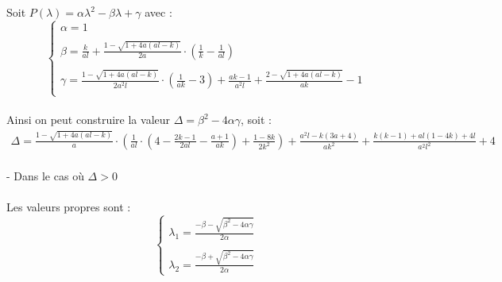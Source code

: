 \documentclass{article}
\begin{document}
Soit $ P(\lambda)= \alpha \lambda^{2} - \beta \lambda + \gamma$ avec : 
\begin{equation*}
\left \{
\begin{array}{l}
     \alpha = 1\\\\
     \beta =  \frac{k}{al} + \frac{1 - \sqrt{1 + 4a(al -k)}}{2a} \cdot \left( \frac{1}{k} - \frac{1}{al} \right) \\\\
     \gamma = \frac{1 - \sqrt{1 + 4a(al -k)}}{2a^2 l} \cdot \left( \frac{1}{ak} - 3 \right) + \frac{ak - 1}{a^2 l} + \frac{2- \sqrt{1 + 4a(al -k)}}{ak} -1 \\
\end{array}
\right.
\end{equation*}\\

Ainsi on peut construire la valeur $ \Delta = \beta^2 - 4 \alpha \gamma $, soit :
\begin{equation*}
\tag{ \Delta }
\label{pt4:delta}
    \begin{array}{l}
        \Delta = \frac{1 - \sqrt{1 + 4a(al -k)}}{a} \cdot \left( \frac{1}{al} \cdot \left( 4 - \frac{2k-1}{2al} - \frac{a+1}{ak} \right) + \frac{1-8k}{2k^2} \right) + \frac{a^2 l - k (3a+4)}{ak^2} + \frac{k(k-1) + al(1-4k) + 4l}{a^2 l^2} + 4 \\
    \end{array}
\end{equation*}


\noindent
- Dans le cas où $\Delta > 0$\\\\ Les valeurs propres sont : 
\begin{equation*}
\left \{
    \begin{array}{l}
        \lambda_{1} = \frac{- \beta - \sqrt{\beta^{2} - 4 \alpha \gamma}}{2\alpha}\\\\
        \lambda_{2} = \frac{- \beta + \sqrt{\beta^{2} - 4 \alpha \gamma}}{2\alpha}
    \end{array}
\right.
\end{equation*}
\end{document}
